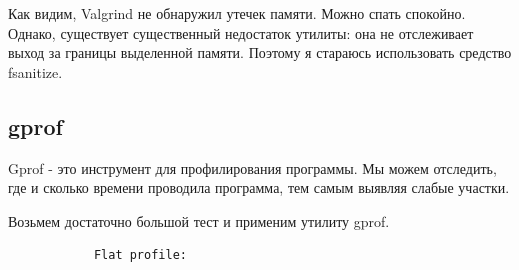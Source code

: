 \documentclass[12pt]{article}
\begin{document}
	Как видим, Valgrind не обнаружил утечек памяти. Можно спать спокойно. Однако, существует существенный недостаток утилиты: она не отслеживает выход за границы выделенной памяти. Поэтому я стараюсь использовать средство fsanitize.
	
	\subsection*{gprof}
	
	Gprof - это инструмент для профилирования программы. Мы можем отследить, где и сколько времени проводила программа, тем самым выявляя слабые участки.
	
	Возьмем достаточно большой тест и применим утилиту gprof.
	
	\begin{small}
		\footnotesize
		\begin{verbatim}
			Flat profile:
			

\end{verbatim}
\end{small}
\end{document}
